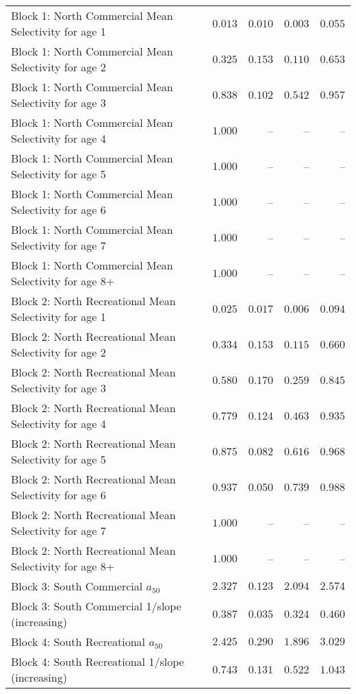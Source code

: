 \documentclass[
]{article}
\begin{document}
\begin{landscape}
\begin{longtable}[t]{lrrrr}
Block 1: North Commercial Mean Selectivity for age 1 & $0.013$ & $0.010$ & $0.003$ & $0.055$\\
Block 1: North Commercial Mean Selectivity for age 2 & $0.325$ & $0.153$ & $0.110$ & $0.653$\\
Block 1: North Commercial Mean Selectivity for age 3 & $0.838$ & $0.102$ & $0.542$ & $0.957$\\
Block 1: North Commercial Mean Selectivity for age 4 & $1.000$ & -- & -- & --\\
\addlinespace
Block 1: North Commercial Mean Selectivity for age 5 & $1.000$ & -- & -- & --\\
Block 1: North Commercial Mean Selectivity for age 6 & $1.000$ & -- & -- & --\\
Block 1: North Commercial Mean Selectivity for age 7 & $1.000$ & -- & -- & --\\
Block 1: North Commercial Mean Selectivity for age 8+ & $1.000$ & -- & -- & --\\
Block 2: North Recreational Mean Selectivity for age 1 & $0.025$ & $0.017$ & $0.006$ & $0.094$\\
\addlinespace
Block 2: North Recreational Mean Selectivity for age 2 & $0.334$ & $0.153$ & $0.115$ & $0.660$\\
Block 2: North Recreational Mean Selectivity for age 3 & $0.580$ & $0.170$ & $0.259$ & $0.845$\\
Block 2: North Recreational Mean Selectivity for age 4 & $0.779$ & $0.124$ & $0.463$ & $0.935$\\
Block 2: North Recreational Mean Selectivity for age 5 & $0.875$ & $0.082$ & $0.616$ & $0.968$\\
Block 2: North Recreational Mean Selectivity for age 6 & $0.937$ & $0.050$ & $0.739$ & $0.988$\\
\addlinespace
Block 2: North Recreational Mean Selectivity for age 7 & $1.000$ & -- & -- & --\\
Block 2: North Recreational Mean Selectivity for age 8+ & $1.000$ & -- & -- & --\\
Block 3: South Commercial $a_{50}$ & $2.327$ & $0.123$ & $2.094$ & $2.574$\\
Block 3: South Commercial 1/slope (increasing) & $0.387$ & $0.035$ & $0.324$ & $0.460$\\
Block 4: South Recreational $a_{50}$ & $2.425$ & $0.290$ & $1.896$ & $3.029$\\
\addlinespace
Block 4: South Recreational 1/slope (increasing) & $0.743$ & $0.131$ & $0.522$ & $1.043$\\

\end{longtable}
\end{landscape}
\end{document}
